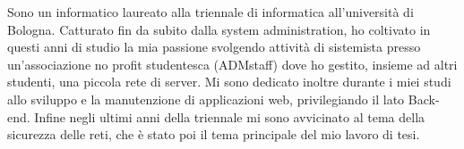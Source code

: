\par{
Sono un informatico laureato alla
triennale di informatica all’universit\`a
di Bologna. Catturato fin da subito
dalla system administration, ho
coltivato in questi anni di studio la
mia passione svolgendo attivit\`a di
sistemista presso un’associazione no
profit studentesca (ADMstaff) dove ho
gestito, insieme ad altri studenti, una
piccola rete di server.
Mi sono dedicato inoltre durante i miei studi allo sviluppo
e la manutenzione di applicazioni web, privilegiando il lato Back-end.
Infine negli ultimi anni della triennale mi sono
avvicinato al tema della sicurezza delle reti,
che \`e stato poi il tema principale del mio lavoro di tesi.
}
